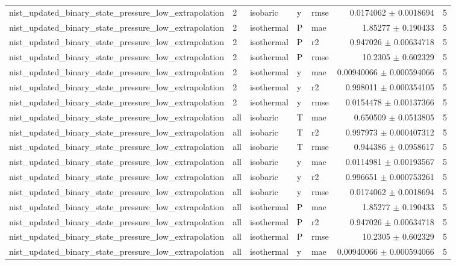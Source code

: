 \begin{tabular}{lllllrr}
nist\_updated\_binary\_state\_pressure\_low\_extrapolation & 2 & isobaric & y & rmse & 0.0174062 $\pm$ 0.0018694 & 5 \\
nist\_updated\_binary\_state\_pressure\_low\_extrapolation & 2 & isothermal & P & mae & 1.85277 $\pm$ 0.190433 & 5 \\
nist\_updated\_binary\_state\_pressure\_low\_extrapolation & 2 & isothermal & P & r2 & 0.947026 $\pm$ 0.00634718 & 5 \\
nist\_updated\_binary\_state\_pressure\_low\_extrapolation & 2 & isothermal & P & rmse & 10.2305 $\pm$ 0.602329 & 5 \\
nist\_updated\_binary\_state\_pressure\_low\_extrapolation & 2 & isothermal & y & mae & 0.00940066 $\pm$ 0.000594066 & 5 \\
nist\_updated\_binary\_state\_pressure\_low\_extrapolation & 2 & isothermal & y & r2 & 0.998011 $\pm$ 0.000354105 & 5 \\
nist\_updated\_binary\_state\_pressure\_low\_extrapolation & 2 & isothermal & y & rmse & 0.0154478 $\pm$ 0.00137366 & 5 \\
nist\_updated\_binary\_state\_pressure\_low\_extrapolation & all & isobaric & T & mae & 0.650509 $\pm$ 0.0513805 & 5 \\
nist\_updated\_binary\_state\_pressure\_low\_extrapolation & all & isobaric & T & r2 & 0.997973 $\pm$ 0.000407312 & 5 \\
nist\_updated\_binary\_state\_pressure\_low\_extrapolation & all & isobaric & T & rmse & 0.944386 $\pm$ 0.0958617 & 5 \\
nist\_updated\_binary\_state\_pressure\_low\_extrapolation & all & isobaric & y & mae & 0.0114981 $\pm$ 0.00193567 & 5 \\
nist\_updated\_binary\_state\_pressure\_low\_extrapolation & all & isobaric & y & r2 & 0.996651 $\pm$ 0.000753261 & 5 \\
nist\_updated\_binary\_state\_pressure\_low\_extrapolation & all & isobaric & y & rmse & 0.0174062 $\pm$ 0.0018694 & 5 \\
nist\_updated\_binary\_state\_pressure\_low\_extrapolation & all & isothermal & P & mae & 1.85277 $\pm$ 0.190433 & 5 \\
nist\_updated\_binary\_state\_pressure\_low\_extrapolation & all & isothermal & P & r2 & 0.947026 $\pm$ 0.00634718 & 5 \\
nist\_updated\_binary\_state\_pressure\_low\_extrapolation & all & isothermal & P & rmse & 10.2305 $\pm$ 0.602329 & 5 \\
nist\_updated\_binary\_state\_pressure\_low\_extrapolation & all & isothermal & y & mae & 0.00940066 $\pm$ 0.000594066 & 5 \\

\end{tabular}
